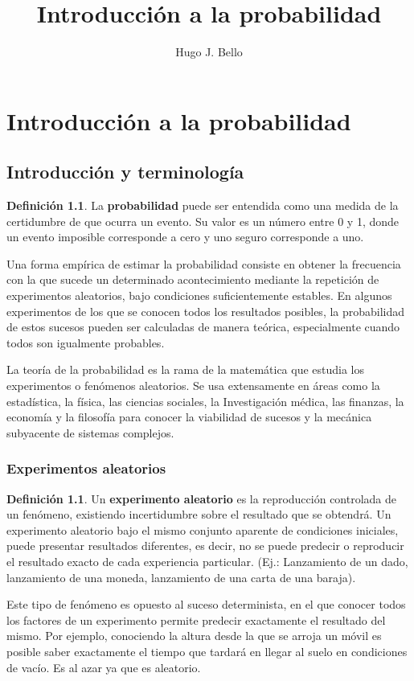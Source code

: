 \documentclass[]{book}
\title{Introducción a la probabilidad}
\author{Hugo J. Bello}
\date{}
\theoremstyle{plain}
\theoremstyle{definition}
\newtheorem{definition}[theorem]{Definición}
\theoremstyle{definition} %
\begin{document}
\chapter{Introducción a la probabilidad}

\section{Introducción y terminología}

\begin{definition}
La \textbf{probabilidad} puede ser entendida como una medida de la certidumbre de que ocurra un evento. 
Su valor es un número entre 0 y 1, 
donde un evento imposible corresponde a cero y uno seguro corresponde a uno.
\end{definition}

Una forma empírica de estimar la probabilidad consiste en obtener la 
frecuencia con la que sucede un determinado acontecimiento mediante la 
repetición de experimentos aleatorios, bajo condiciones suficientemente estables. 
En algunos experimentos de los que se conocen todos los resultados posibles, 
la probabilidad de estos sucesos pueden ser calculadas de manera teórica, 
especialmente cuando todos son igualmente probables.

La teoría de la probabilidad es la rama de la matemática que estudia los experimentos 
o fenómenos aleatorios. Se usa extensamente en áreas como la estadística, 
la física, las ciencias sociales, la Investigación médica, las finanzas, 
la economía y la filosofía para conocer la viabilidad de sucesos 
y la mecánica subyacente de sistemas complejos. 

\subsection*{Experimentos aleatorios}

\begin{definition}
Un \textbf{experimento aleatorio} es la reproducción controlada de un fenómeno, 
existiendo incertidumbre sobre el resultado que se obtendrá.
Un experimento aleatorio bajo el mismo conjunto aparente de condiciones iniciales, 
puede presentar resultados diferentes, es decir, no se puede predecir o reproducir 
el resultado exacto de cada experiencia particular. (Ej.: Lanzamiento de un dado,
lanzamiento de una moneda, lanzamiento de una carta de una baraja).

Este tipo de fenómeno es opuesto al suceso determinista, 
en el que conocer todos los factores de un experimento permite 
predecir exactamente el resultado del mismo. Por ejemplo, conociendo 
la altura desde la que se arroja un móvil es posible saber exactamente
el tiempo que tardará en llegar al suelo en condiciones de vacío. 
 Es al azar ya que es aleatorio. 
\end{definition}
\end{document}
